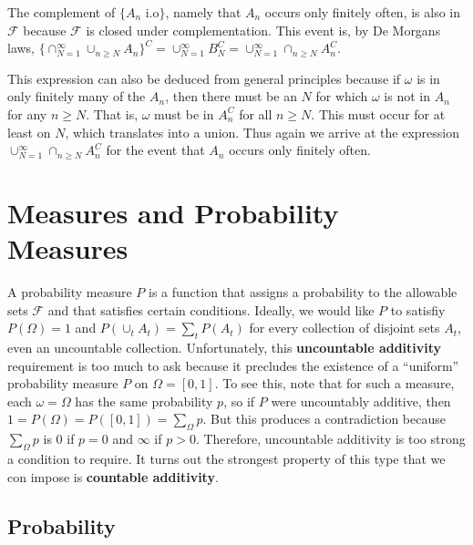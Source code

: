 \documentclass[
  b5paper,
]{scrbook}
\theoremstyle{definition}
\theoremstyle{definition}
\theoremstyle{definition}
\theoremstyle{remark}
\let\BeginKnitrBlock\begin \let\EndKnitrBlock\end
\begin{document}
\BeginKnitrBlock{remark}
{}The complement of \(\{A_n \text{ i.o}\}\), namely that \(A_n\) occurs only finitely often, is also in \(\mathcal{F}\) because \(\mathcal{F}\) is closed under complementation. This event is, by De Morgans laws, \(\{\cap_{N=1}^{\infty}\cup_{n\geq N} A_n \}^{C} = \cup_{N=1}^{\infty}B_{N}^{C} = \cup_{N=1}^{\infty}\cap_{n\geq N} A_{n}^{C}\).

This expression can also be deduced from general principles because if \(\omega\) is in only finitely many of the \(A_n\), then there must be an \(N\) for which \(\omega\) is not in \(A_{n}\) for any \(n\geq N\). That is, \(\omega\) must be in \(A_{n}^{C}\) for all \(n\geq N\). This must occur for at least on \(N\), which translates into a union. Thus again we arrive at the expression \(\cup_{N=1}^{\infty}\cap_{n\geq N}A_{n}^{C}\) for the event that \(A_{n}\) occurs only finitely often.
\EndKnitrBlock{remark}

\hypertarget{measures-and-probability-measures}{%
\chapter{Measures and Probability Measures}\label{measures-and-probability-measures}}

A probability measure \(P\) is a function that assigns a probability to the allowable sets \(\mathcal{F}\) and that satisfies certain conditions. Ideally, we would like \(P\) to satisfiy \(P(\Omega)=1\) and \(P(\cup_{t}A_t)=\sum_{t}P(A_t)\) for every collection of disjoint sets \(A_t\), even an uncountable collection. Unfortunately, this \textbf{uncountable additivity} requirement is too much to ask because it precludes the existence of a ``uniform'' probability measure \(P\) on \(\Omega=[0,1]\). To see this, note that for such a measure, each \(\omega=\Omega\) has the same probability \(p\), so if \(P\) were uncountably additive, then \(1=P(\Omega)=P([0,1])=\sum_{\Omega}p\). But this produces a contradiction because \(\sum_{\Omega}p\) is \(0\) if \(p=0\) and \(\infty\) if \(p>0\). Therefore, uncountable additivity is too strong a condition to require. It turns out the strongest property of this type that we con impose is \textbf{countable additivity}.

\hypertarget{probability}{%
\section{Probability}\label{probability}}
\end{document}
